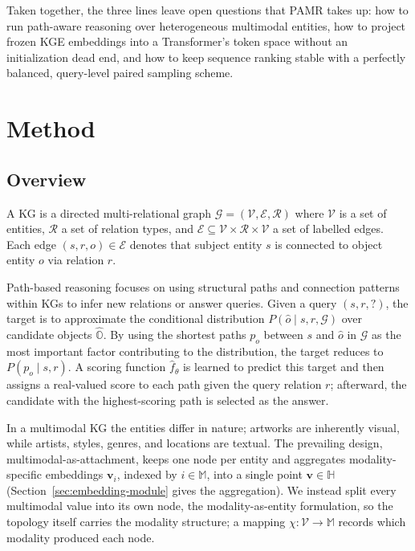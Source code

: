 \documentclass[runningheads]{llncs}
\begin{document}
Taken together, the three lines leave open questions that PAMR takes up: how to run path-aware reasoning over heterogeneous multimodal entities, how to project frozen KGE embeddings into a Transformer's token space without an initialization dead end, and how to keep sequence ranking stable with a perfectly balanced, query-level paired sampling scheme.

\section{Method}
\label{sec:method}
\subsection{Overview}
\label{sec:overview}

A KG is a directed multi-relational graph
$\mathcal{G} = (\mathcal{V}, \mathcal{E}, \mathcal{R})$ where
$\mathcal{V}$ is a set of entities, $\mathcal{R}$ a set of relation types,
and $\mathcal{E} \subseteq \mathcal{V} \times \mathcal{R} \times \mathcal{V}$
a set of labelled edges. Each edge $(s, r, o) \in \mathcal{E}$
denotes that subject entity $s$ is connected to object entity $o$
via relation $r$.

Path-based reasoning focuses on using structural paths and connection
patterns within KGs to infer new relations or answer queries. Given
a query $(s, r, ?)$, the target is to approximate the conditional
distribution $P(\hat{o} \mid s, r, \mathcal{G})$ over candidate
objects $\hat{\mathbb{O}}$. By using the shortest paths $p_o$ between $s$ and $\hat{o}$ in $\mathcal{G}$ as the most important factor contributing to the distribution,
the target reduces to $P(p_o \mid s, r)$. A scoring function
$\hat{f}_\theta$ is learned to predict this target and then assigns a real-valued score to each path given the
query relation $r$; afterward, the candidate with the highest-scoring path is selected as the answer.

In a multimodal KG the entities differ in nature; artworks are inherently visual, while artists, styles, genres, and locations are textual. The prevailing design, multimodal-as-attachment, keeps one node per entity and aggregates modality-specific embeddings $\mathbf{v}_i$, indexed by $i \in \mathbb{M}$, into a single point $\mathbf{v} \in \mathbb{H}$ (Section~\ref{sec:embedding-module} gives the aggregation). We instead split every multimodal value into its own node, the modality-as-entity formulation, so the topology itself carries the modality structure; a mapping $\chi: \mathcal{V} \to \mathbb{M}$ records which modality produced each node.
\end{document}
